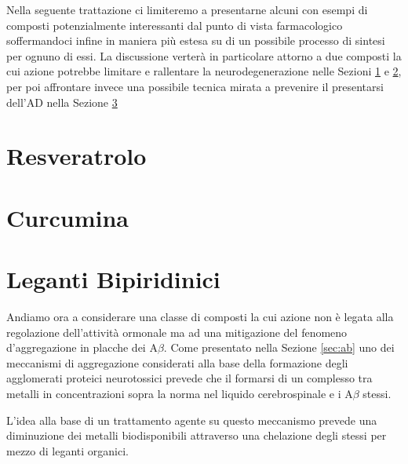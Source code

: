 \documentclass[a4paper, 12pt]{article}
\begin{document}
Nella seguente trattazione ci limiteremo a presentarne alcuni con esempi di composti potenzialmente interessanti dal punto di vista farmacologico soffermandoci infine in maniera più estesa su di un possibile processo di sintesi per ognuno di essi.
La discussione verterà in particolare attorno a due composti la cui azione potrebbe limitare e rallentare la neurodegenerazione nelle Sezioni \ref{sec:resv} e \ref{sec:curc}, per poi affrontare invece una possibile tecnica mirata a prevenire il presentarsi dell'AD nella Sezione \ref{sec:byp}

\section{Resveratrolo}
\label{sec:resv}

\section{Curcumina}
\label{sec:curc}

\section{Leganti Bipiridinici}
\label{sec:byp}
Andiamo ora a considerare una classe di composti la cui azione non è legata alla regolazione dell'attività ormonale ma ad una mitigazione del fenomeno d'aggregazione in placche dei A$\beta$. Come presentato nella Sezione \ref{sec:ab} uno dei meccanismi di aggregazione considerati alla base della formazione degli agglomerati proteici neurotossici prevede che il formarsi di un complesso tra metalli in concentrazioni sopra la norma nel liquido cerebrospinale e i A$\beta$ stessi.

L'idea alla base di un trattamento agente su questo meccanismo prevede una diminuzione dei metalli biodisponibili attraverso una chelazione degli stessi per mezzo di leganti organici.
\end{document}
